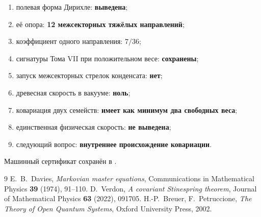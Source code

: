 \begin{protocol}
\begin{enumerate}
 \item полевая форма Дирихле: \textbf{выведена};
 \item её опора: \textbf{12 межсекторных тяжёлых направлений};
 \item коэффициент одного направления: \textbf{$7/36$};
 \item сигнатуры Тома VII при положительном весе: \textbf{сохранены};
 \item запуск межсекторных стрелок конденсата: \textbf{нет};
 \item древесная скорость в вакууме: \textbf{ноль};
 \item ковариация двух семейств: \textbf{имеет как минимум два свободных веса};
 \item единственная физическая скорость: \textbf{не выведена};
 \item следующий вопрос: \textbf{внутреннее происхождение ковариации}.
\end{enumerate}
\end{protocol}

Машинный сертификат сохранён в
.

\begin{thebibliography}{9}
E.~B.~Davies,
\emph{Markovian master equations},
Communications in Mathematical Physics \textbf{39} (1974), 91--110.
D.~Verdon,
\emph{A covariant Stinespring theorem},
Journal of Mathematical Physics \textbf{63} (2022), 091705.
H.-P.~Breuer, F.~Petruccione,
\emph{The Theory of Open Quantum Systems}, Oxford University Press, 2002.
\end{thebibliography}
